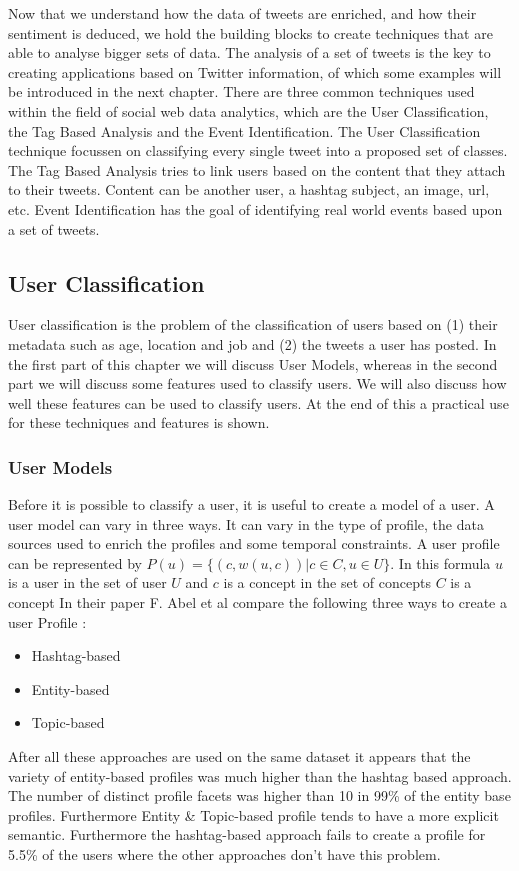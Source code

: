 \documentclass{article}
\begin{document}
Now that we understand how the data of tweets are enriched, and how their sentiment is deduced, we hold the building blocks to create techniques that are able
to analyse bigger sets of data. The analysis of a set of tweets is the key to creating applications based on Twitter information, of which some examples
will be introduced in the next chapter. There are three common techniques used within the field of social web data analytics, which are the User Classification,
the Tag Based Analysis and the Event Identification. The User Classification technique focussen on classifying every single tweet into a proposed set of classes.
The Tag Based Analysis tries to link users based on the content that they attach to their tweets. Content can be another user, a hashtag subject, an image, url, etc.
Event Identification has the goal of identifying real world events based upon a set of tweets.

\subsection{User Classification}

User classification is the problem of the classification of users based on (1) their metadata such as age, location and job and (2) the tweets a user has posted. In the first part of this chapter we will discuss User Models, whereas in the second part we will discuss some features used to classify users. We will also discuss how well these features can be used to classify users. At the end of this a practical use for these techniques and features is shown. 

\subsubsection*{User Models}

Before it is possible to classify a user, it is useful to create a model of a user. A user model can vary in three ways. It can vary in the type of profile, the data sources used to enrich the profiles and some temporal constraints. A user profile can be represented by $P(u) = \{(c, w(u,c))| c \in C, u \in U\}$. In this formula $u$ is a user in the set of user $U$ and $c$ is a concept in the set of concepts $C$ is a concept In their paper F. Abel et al compare the following three ways to create a user Profile \cite{usermodel}:
\begin{itemize}
\item Hashtag-based
\item Entity-based
\item Topic-based
\end{itemize}
After all these approaches are used on the same dataset it appears that the variety of entity-based profiles was much higher than the hashtag based approach. The number of distinct profile facets was higher than 10 in 99\% of the entity base profiles. Furthermore Entity \& Topic-based profile tends to have a more explicit semantic.  \cite{usermodel} Furthermore the hashtag-based approach fails to create a profile for 5.5\% of the users where the other approaches don't have this problem. 
\end{document}
